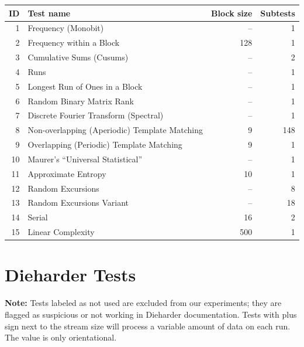 \documentclass[
	digital,    %
	oneside,
	color,
	11pt,
	nocover,
	notable,
	nolof,
	nolot,
]{fithesis3}
\theoremstyle{definition}
\theoremstyle{remark}
\begin{document}
\begin{nomar}
\centering
\begin{tabular}{@{}rlrr@{}} \toprule
\textbf{ID} & \textbf{Test name} & \textbf{Block size} & \textbf{Subtests} \\ \midrule
1  & Frequency (Monobit)                           & --  & 1 \\
2  & Frequency within a Block                      & 128 & 1 \\
3  & Cumulative Sums (Cusums)	                   & --  & 2 \\
4  & Runs                                          & --  & 1 \\
5  & Longest Run of Ones in a Block                & --  & 1 \\
6  & Random Binary Matrix Rank                     & --  & 1 \\
7  & Discrete Fourier Transform (Spectral)         & --  & 1 \\
8  & Non-overlapping (Aperiodic) Template Matching & 9   & 148 \\
9  & Overlapping (Periodic) Template Matching      & 9   & 1 \\
10 & Maurer's “Universal Statistical” 	           & --  & 1 \\
11 & Approximate Entropy 	                       & 10  & 1 \\
12 & Random Excursions 	                           & --  & 8 \\
13 & Random Excursions Variant	                   & --  & 18 \\
14 & Serial                                        & 16  & 2 \\
15 & Linear Complexity	                           & 500 & 1 \\ \bottomrule
\end{tabular}
\end{nomar}

\chapter{Dieharder Tests}
\label{app:dieharder_tests}
\textbf{Note:} Tests labeled as not used are excluded from our experiments; they are flagged as suspicious or not working in Dieharder documentation. Tests with plus sign next to the stream size will process a variable amount of data on each run. The value is only orientational.
\end{document}
